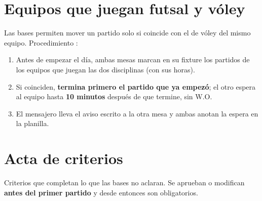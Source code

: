 \section{Equipos que juegan futsal y vóley}\label{sec:cruces}
Las bases permiten mover un partido solo si coincide con el de vóley del mismo equipo. Procedimiento :
\begin{enumerate}
	\item Antes de empezar el día, ambas mesas marcan en su fixture los partidos de los equipos que juegan las dos disciplinas (con sus horas).
	\item Si coinciden, \textbf{termina primero el partido que ya empezó}; el otro espera al equipo hasta \textbf{10 minutos} después de que termine, sin W.O.
	\item El mensajero lleva el aviso escrito a la otra mesa y ambas anotan la espera en la planilla.
\end{enumerate}

\section{Acta de criterios}
Criterios que completan lo que las bases no aclaran. Se aprueban o modifican \textbf{antes del primer partido} y desde entonces son obligatorios.

